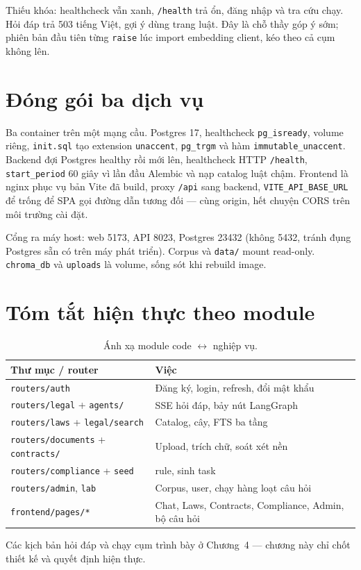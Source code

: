Thiếu khóa: healthcheck vẫn xanh, \texttt{/health} trả ổn, đăng nhập và tra cứu
chạy. Hỏi đáp trả 503 tiếng Việt, gợi ý dùng trang luật. Đây là chỗ thầy góp ý
sớm; phiên bản đầu tiên từng \texttt{raise} lúc import embedding client, kéo theo
cả cụm không lên.

\section{Đóng gói ba dịch vụ}

Ba container trên một mạng cầu. Postgres 17, healthcheck \texttt{pg\_isready},
volume riêng, \texttt{init.sql} tạo extension \texttt{unaccent}, \texttt{pg\_trgm}
và hàm \texttt{immutable\_unaccent}. Backend đợi Postgres healthy rồi mới lên,
healthcheck HTTP \texttt{/health}, \texttt{start\_period} 60 giây vì lần đầu
Alembic và nạp catalog luật chậm. Frontend là nginx phục vụ bản Vite đã build,
proxy \texttt{/api} sang backend, \texttt{VITE\_API\_BASE\_URL} để trống để SPA
gọi đường dẫn tương đối --- cùng origin, hết chuyện CORS trên môi trường cài
đặt.

Cổng ra máy host: web 5173, API 8023, Postgres 23432 (không 5432, tránh đụng
Postgres sẵn có trên máy phát triển). Corpus và \texttt{data/} mount read-only.
\texttt{chroma\_db} và \texttt{uploads} là volume, sống sót khi rebuild image.

\section{Tóm tắt hiện thực theo module}

\begin{table}[htp]
\centering
\caption{Ánh xạ module code $\leftrightarrow$ nghiệp vụ.}
\label{tab:module-map}
\begin{tabular}{p{4.2cm}p{9.5cm}}
\toprule
\textbf{Thư mục / router} & \textbf{Việc} \\
\midrule
\texttt{routers/auth} & Đăng ký, login, refresh, đổi mật khẩu \\
\texttt{routers/legal} + \texttt{agents/} & SSE hỏi đáp, bảy nút LangGraph \\
\texttt{routers/laws} + \texttt{legal/search} & Catalog, cây, FTS ba tầng \\
\texttt{routers/documents} + \texttt{contracts/} & Upload, trích chữ, soát xét nền \\
\texttt{routers/compliance} + \texttt{seed} & \soRule{} rule, sinh task \\
\texttt{routers/admin}, \texttt{lab} & Corpus, user, chạy hàng loạt câu hỏi \\
\texttt{frontend/pages/*} & Chat, Laws, Contracts, Compliance, Admin, bộ câu hỏi \\
\bottomrule
\end{tabular}
\end{table}

Các kịch bản hỏi đáp và chạy cụm trình bày ở Chương~4 --- chương này chỉ chốt
thiết kế và quyết định hiện thực.





